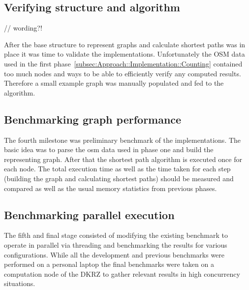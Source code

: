 \subsection{Verifying structure and algorithm}
\label{subsec:Approach::Implementation::Verification}

// wording?!

After the base structure to represent graphs and calculate shortest paths was in place it was time to validate the implementations. Unfortunately the OSM data used in the first phase~\ref{subsec:Approach::Implementation::Counting} contained too much nodes and ways to be able to efficiently verify any computed results. Therefore a small example graph was manually populated and fed to the algorithm.

\subsection{Benchmarking graph performance}
\label{subsec:Approach::Implementation::SequentialBenchmark}

The fourth milestone was preliminary benchmark of the implementations. The basic idea was to parse the \gls{osm} data used in phase one and build the representing graph. After that the shortest path algorithm is executed once for each node. The total execution time as well as the time taken for each step (building the graph and calculating shortest paths) should be measured and compared as well as the usual memory statistics from previous phases.

\subsection{Benchmarking parallel execution}
\label{subsec:Approach::Implementation::ParallelBenchmark}

The fifth and final stage consisted of modifying the existing benchmark to operate in parallel via threading and benchmarking the results for various configurations. While all the development and previous benchmarks were performed on a personal laptop the final benchmarks were taken on a computation node of the DKRZ to gather relevant results in high concurrency situations.
